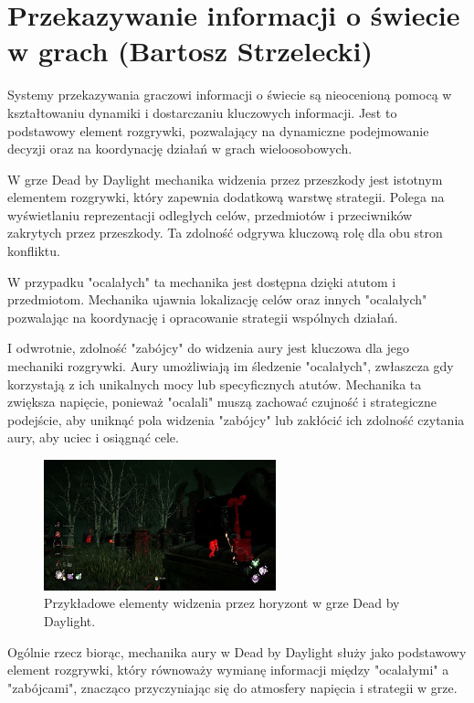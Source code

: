 \section{Przekazywanie informacji o świecie w grach (Bartosz Strzelecki)}\label{chap:dbd}
Systemy przekazywania graczowi informacji o świecie są nieocenioną pomocą w kształtowaniu dynamiki i dostarczaniu kluczowych informacji.
Jest to podstawowy element rozgrywki, pozwalający na dynamiczne podejmowanie decyzji oraz na koordynację działań w grach wieloosobowych.

W grze Dead by Daylight mechanika widzenia przez przeszkody jest istotnym elementem rozgrywki, który
zapewnia dodatkową warstwę strategii. Polega na wyświetlaniu reprezentacji odległych celów, przedmiotów i przeciwników
zakrytych przez przeszkody. Ta zdolność odgrywa kluczową rolę dla obu stron konfliktu.

W przypadku "ocalałych" ta mechanika jest dostępna dzięki atutom i przedmiotom. Mechanika ujawnia lokalizację celów oraz
innych "ocalałych" pozwalając na koordynację i opracowanie strategii wspólnych działań.

I odwrotnie, zdolność "zabójcy" do widzenia aury jest kluczowa dla jego mechaniki rozgrywki.
Aury umożliwiają im śledzenie "ocalałych", zwłaszcza gdy korzystają z ich unikalnych mocy lub specyficznych atutów.
Mechanika ta zwiększa napięcie, ponieważ "ocalali" muszą zachować czujność i strategiczne podejście,
aby uniknąć pola widzenia "zabójcy" lub zakłócić ich zdolność czytania aury, aby uciec i osiągnąć cele.

\begin{figure}[h]
\centering
\includegraphics[width=0.6\textwidth]{images/aura}
\caption{Przykładowe elementy widzenia przez horyzont w grze Dead by Daylight.}
\end{figure}

Ogólnie rzecz biorąc, mechanika aury w Dead by Daylight służy jako podstawowy element rozgrywki,
który równoważy wymianę informacji między "ocalałymi" a "zabójcami", znacząco przyczyniając się do atmosfery napięcia i strategii w grze.

